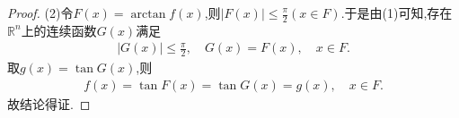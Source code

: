 \documentclass[../../main.tex]{subfiles}%
\begin{document}
\begin{proof}
(2)令\(F(x)=\arctan f(x)\),则$|F(x)|\leqslant \frac{\pi}{2}(x\in F)$.于是由(1)可知,存在$\mathbb{R}^n$上的连续函数$G(x)$满足
\begin{align*}
|G(x)|\leqslant \frac{\pi}{2},\quad G(x)=F(x),\quad x\in F.
\end{align*}
取$g(x)=\tan G(x)$,则
\begin{align*}
f(x)=\tan F(x)=\tan G(x)=g(x),\quad x\in F.
\end{align*}
故结论得证.

\end{proof}
\end{document}
